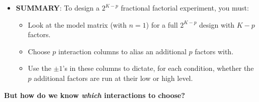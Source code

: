 \begin{itemize}
      \item \textbf{SUMMARY}: To design a $ 2^{K-p} $ fractional factorial experiment, you must:
            \begin{itemize}[*]
                  \item Look at the model matrix (with $ n=1 $) for a full $ 2^{K-p} $ design with $ K-p $ factors.
                  \item Choose $ p $ interaction columns to alias an additional $ p $ factors with.
                  \item Use the $ \pm 1 $'s in these columns to dictate, for each condition, whether the $p$ additional factors are
                        run at their low or high level.
            \end{itemize}
\end{itemize}
\begin{framed}
      \begin{tightcenter}
            \textbf{But how do we know \emph{which} interactions to choose?}
      \end{tightcenter}
\end{framed}
